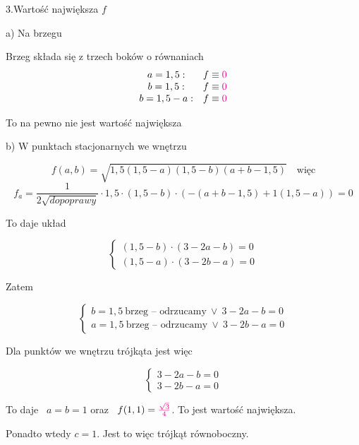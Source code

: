 3.Wartość największa $f$ \bigskip

a) Na brzegu

Brzeg składa się z trzech boków o równaniach
\[ \begin{array}{cc}
    a = 1,5: & f \equiv \textcolor{magenta}{0} \\
    b = 1,5: & f \equiv \textcolor{magenta}{0} \\
    b = 1,5 - a: & f \equiv \textcolor{magenta}{0} \\
\end{array}
\]

To na pewno nie jest wartość największa \bigskip

b) W punktach stacjonarnych we wnętrzu

\[ f(a,b) = \sqrt{1,5(1,5-a)(1,5-b)(a+b-1,5)} \quad \textrm{więc} \]
\[ f_a = \frac{1}{2\sqrt{do poprawy}} \cdot 1,5 \cdot (1,5 - b) \cdot (-(a+b - 1,5) + 1(1,5 - a)) = 0 \]

To daje układ

\[ \begin{cases} (1,5 - b) \cdot (3 - 2a - b) = 0 \\ (1,5 - a) \cdot (3 - 2b - a) = 0 \end{cases} \]

Zatem 

\[ \begin{cases} b = 1,5 \ \textrm{brzeg -- odrzucamy} \ \lor \ 3 - 2a - b = 0 \\
    a = 1,5 \ \textrm{brzeg -- odrzucamy} \ \lor \ 3 - 2b - a = 0
\end{cases} \]

Dla punktów we wnętrzu trójkąta jest więc

\[ 
\begin{cases}
    3 - 2a - b = 0 \\
    3 - 2b - a = 0
\end{cases}    
\]

To daje \ $ a = b = 1$ oraz \ $ f(1,1) = \textcolor{magenta}{\frac{\sqrt3}{4}} $. To jest wartość największa.

Ponadto wtedy $c = 1$. Jest to więc trójkąt równoboczny.